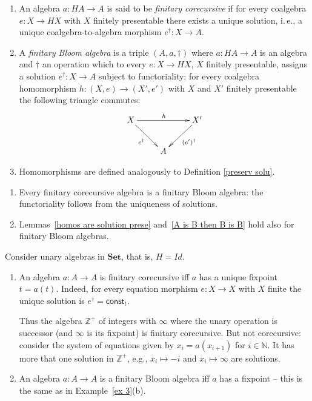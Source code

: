 \documentclass{LMCS}
\theoremstyle{plain}
\theoremstyle{definition}
\numberwithin{equation}{section}
\begin{document}
\begin{defi}\hfill
\begin{enumerate}[label=\({\alph*}]
\item  An algebra $a:HA\rightarrow A$ is said to be {\it finitary corecursive} if for every coalgebra $e:X\rightarrow HX$ with $X$ finitely presentable there exists a unique solution, i.\,e., a unique coalgebra-to-algebra morphism $e^\dagger:X\rightarrow A$.

\item A {\it finitary Bloom algebra} is a triple $(A,a,\dagger)$ where $a:HA\rightarrow A$ is an algebra and $\dagger$ an operation which to every $e:X\rightarrow HX$, $X$ finitely presentable, assigns a solution $e^\dagger: X\rightarrow A$ subject to functoriality: for every coalgebra homomorphism $h:(X,e)\rightarrow (X',e')$ with $X$ and $X'$ finitely presentable the following triangle commutes:
$$\xymatrix{
X\ar[rd]_{e^\dagger}\ar[rr]^h&&X'\ar[ld]^{(e')^\dagger}\\
&A
}$$

\item Homomorphisms are defined analogously to Definition \ref{preserv
    solu}.
\end{enumerate}
\end{defi}

\begin{rem}\label{rem_finitely cores are finitely Bloom}\hfill
\begin{enumerate}[label=\({\alph*}]
\item  Every finitary corecursive algebra is a finitary Bloom algebra: the functoriality follows from the uniqueness of solutions.

\item Lemmas~\ref{homos are solution prese} and~\ref{A is B then B is B} hold also for finitary
  Bloom algebras. 
\end{enumerate}
\end{rem}

\begin{exa}
Consider unary algebras in $\mathbf{Set}$, that is, $H=Id$. 
\begin{enumerate}[label=\({\alph*}]
\item 
An algebra $a: A\to A$ is finitary corecursive iff $a$ has a unique fixpoint $t = a(t)$. Indeed, for every equation morphism $e:X\to X$ with $X$ finite the unique solution is $e^\dag=\mathsf{const}_t$.

Thus the algebra $\mathbb Z^+$ of integers with $\infty$ where the unary operation is successor (and $\infty$ is its fixpoint) is finitary corecursive. But not corecursive: consider the system of equations given by $x_i=a(x_{i+1})$ for $i\in \mathbb N$. It has more that one solution in $\mathbb Z^+$, e.g., $x_i\mapsto -i$ and $x_i \mapsto \infty$ are solutions.
\item An algebra $a: A \to A$ is a finitary Bloom algebra iff $a$ has a fixpoint -- this is the same as in Example~\ref{ex 3}(b).
\end{enumerate}
\end{exa}
\end{document}
